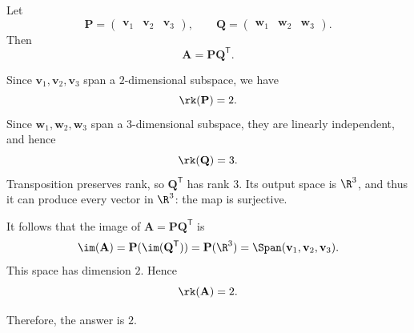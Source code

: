     \begin{solution}
        Let
        \[
            \mathbf{P}
            =
            \begin{pmatrix}
                \mathbf{v}_1 & \mathbf{v}_2 & \mathbf{v}_3
            \end{pmatrix},
            \qquad
            \mathbf{Q}
            =
            \begin{pmatrix}
                \mathbf{w}_1 & \mathbf{w}_2 & \mathbf{w}_3
            \end{pmatrix}.
        \]
        Then
        \[
            \mathbf{A}
            =
            \mathbf{P}\mathbf{Q}^{\mathsf T}.
        \]

        Since $\mathbf{v}_1,\mathbf{v}_2,\mathbf{v}_3$ span a $2$-dimensional subspace, we have
        \[
            \rk(\mathbf{P})=2.
        \]
        Since $\mathbf{w}_1,\mathbf{w}_2,\mathbf{w}_3$ span a $3$-dimensional subspace, they are
        linearly independent, and hence
        \[
            \rk(\mathbf{Q})=3.
        \]
        Transposition preserves rank, so $\mathbf{Q}^{\mathsf T}$ has rank $3$. Its output space is $\R^3$, and thus it can produce every vector in $\R^3$: the map is surjective.

        It follows that the image of $\mathbf{A}=\mathbf{P}\mathbf{Q}^{\mathsf T}$ is
        \[
            \im(\mathbf{A})
            =
            \mathbf{P}(\im(\mathbf{Q}^{\mathsf T}))
            =
            \mathbf{P}(\R^3)
            =
            \Span(\mathbf{v}_1,\mathbf{v}_2,\mathbf{v}_3).
        \]
        This space has dimension $2$. Hence
        \[
            \rk(\mathbf{A})=2.
        \]

        Therefore, the answer is $\boxed{2}$.
    \end{solution}

